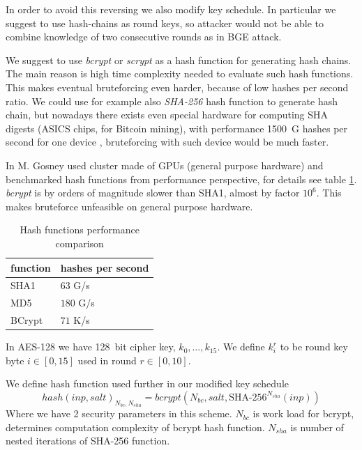 \documentclass[11pt,oneside,final]{fithesis2}
\begin{document}
    In order to avoid this reversing we also modify key schedule.
    In particular we suggest to use hash-chains as round keys, so attacker would not be able to combine knowledge of two consecutive rounds as in BGE attack.
    
    We suggest to use \emph{bcrypt} \cite{bcrypt} \citep{Provos99afuture-adaptable} or \emph{scrypt} \citep{Percival_strongerkey} as a hash function for generating hash chains. The main reason is high time complexity needed to evaluate 
    such hash functions. This makes eventual bruteforcing even harder, because of low hashes per second ratio. We could
    use for example also \emph{SHA-256} hash function to generate hash chain, but nowadays there exists even special hardware for computing SHA digests 
    (ASICS chips, for Bitcoin mining), with performance 1500~G hashes per second for one device \cite{shamining} \cite{shamining_web}, bruteforcing with such device would be
    much faster. 
    
    In \cite{bcrypthash} M. Gosney used cluster made of GPUs (general purpose hardware) and benchmarked hash functions from performance perspective, for
    details see table \ref{tbl:hash_performance}. \emph{bcrypt} is by orders of magnitude slower than SHA1, almost by factor $10^6$. This makes bruteforce
    unfeasible on general purpose hardware. 

    \begin{table}
    \begin{center}
    \begin{tabular}{ l | l }
	function & hashes per second \\ \hline
	SHA1     & $63$ G/s \\ \hline
	MD5      & $180$ G/s \\ \hline
	BCrypt   & $71$ K/s \\   \hline
    \end{tabular}
    \caption{Hash functions performance comparison}
    \label{tbl:hash_performance}
    \end{center} 
    \end{table}
    
    In AES-128 we have 128~bit cipher key, $k_0,\dots,k_{15}$. We define $k_i^r$ to be round key byte $i \in [0,15]$ used in round $r \in [0,10]$.
    
    We define hash function used further in our modified key schedule
    \begin{equation}
	hash\left(inp, salt\right)_{N_{bc}, N_{sha}} = bcrypt\left(N_{bc}, salt, \text{SHA-}256^{N_{sha}}\left(inp\right)\right)
    \end{equation}
    Where we have 2 security parameters in this scheme.
    $N_{bc}$ is work load for bcrypt, determines computation complexity of bcrypt hash function. $N_{sha}$ is number of nested iterations of SHA-256 function. 
    
\end{document}
